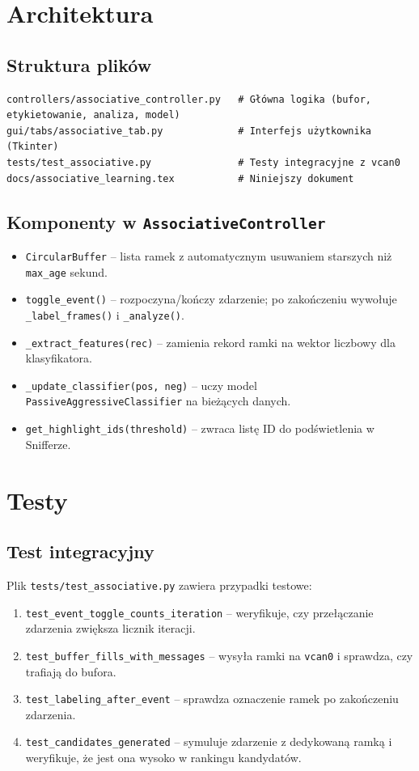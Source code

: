 \documentclass[a4paper,12pt]{article}
\begin{document}
\section{Architektura}

\subsection{Struktura plików}
\begin{verbatim}
controllers/associative_controller.py   # Główna logika (bufor, etykietowanie, analiza, model)
gui/tabs/associative_tab.py             # Interfejs użytkownika (Tkinter)
tests/test_associative.py               # Testy integracyjne z vcan0
docs/associative_learning.tex           # Niniejszy dokument
\end{verbatim}

\subsection{Komponenty w \texttt{AssociativeController}}
\begin{itemize}[noitemsep]
    \item \texttt{CircularBuffer} – lista ramek z automatycznym usuwaniem starszych niż \texttt{max\_age} sekund.
    \item \texttt{toggle\_event()} – rozpoczyna/kończy zdarzenie; po zakończeniu wywołuje \texttt{\_label\_frames()} i \texttt{\_analyze()}.
    \item \texttt{\_extract\_features(rec)} – zamienia rekord ramki na wektor liczbowy dla klasyfikatora.
    \item \texttt{\_update\_classifier(pos, neg)} – uczy model \texttt{PassiveAggressiveClassifier} na bieżących danych.
    \item \texttt{get\_highlight\_ids(threshold)} – zwraca listę ID do podświetlenia w Snifferze.
\end{itemize}

\section{Testy}

\subsection{Test integracyjny}
Plik \texttt{tests/test\_associative.py} zawiera przypadki testowe:
\begin{enumerate}[noitemsep]
    \item \texttt{test\_event\_toggle\_counts\_iteration} – weryfikuje, czy przełączanie zdarzenia zwiększa licznik iteracji.
    \item \texttt{test\_buffer\_fills\_with\_messages} – wysyła ramki na \texttt{vcan0} i sprawdza, czy trafiają do bufora.
    \item \texttt{test\_labeling\_after\_event} – sprawdza oznaczenie ramek po zakończeniu zdarzenia.
    \item \texttt{test\_candidates\_generated} – symuluje zdarzenie z dedykowaną ramką i weryfikuje, że jest ona wysoko w rankingu kandydatów.
\end{enumerate}
\end{document}

